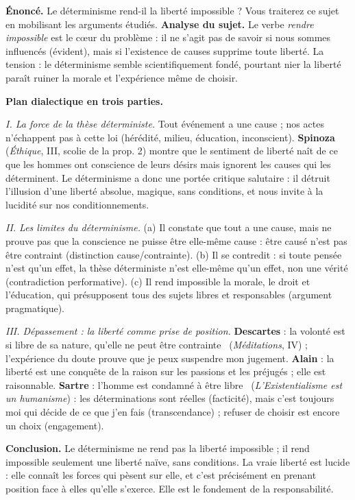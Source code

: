 \documentclass[11pt]{article}
\newcommand{\cle}[1]{{\popxbold\color{popdark}#1}}
\begin{document}
\begin{exoresolu}
\textbf{Énoncé.} Le déterminisme rend-il la liberté impossible ? Vous traiterez ce sujet en mobilisant les arguments étudiés.
\tcblower
\textbf{Analyse du sujet.} Le verbe \emph{rendre impossible} est le cœur du problème : il ne s'agit pas de savoir si nous sommes influencés (évident), mais si l'existence de causes supprime toute liberté. La tension : le déterminisme semble scientifiquement fondé, pourtant nier la liberté paraît ruiner la morale et l'expérience même de choisir.

\textbf{Plan dialectique en trois parties.}

\emph{I. La force de la thèse déterministe.} Tout événement a une cause ; nos actes n'échappent pas à cette loi (hérédité, milieu, éducation, inconscient). \textbf{Spinoza} (\emph{Éthique}, III, scolie de la prop. 2) montre que le sentiment de liberté naît de ce que les hommes ont conscience de leurs désirs mais ignorent les causes qui les déterminent. Le déterminisme a donc une portée critique salutaire : il détruit l'illusion d'une liberté absolue, magique, sans conditions, et nous invite à la lucidité sur nos conditionnements.

\emph{II. Les limites du déterminisme.} (a) Il constate que tout a une cause, mais ne prouve pas que la conscience ne puisse être elle-même cause : être causé n'est pas être contraint (distinction cause/contrainte). (b) Il se contredit : si toute pensée n'est qu'un effet, la thèse déterministe n'est elle-même qu'un effet, non une vérité (contradiction performative). (c) Il rend impossible la morale, le droit et l'éducation, qui présupposent tous des sujets libres et responsables (argument pragmatique).

\emph{III. Dépassement : la liberté comme prise de position.} \textbf{Descartes} : la volonté est \guillemotleft si libre de sa nature, qu'elle ne peut être contrainte \guillemotright\ (\emph{Méditations}, IV) ; l'expérience du doute prouve que je peux suspendre mon jugement. \textbf{Alain} : la liberté est une conquête de la raison sur les passions et les préjugés ; elle est \cle{raisonnable}. \textbf{Sartre} : l'homme est \guillemotleft condamné à être libre \guillemotright\ (\emph{L'Existentialisme est un humanisme}) : les déterminations sont réelles (facticité), mais c'est toujours moi qui décide de ce que j'en fais (transcendance) ; refuser de choisir est encore un choix (\cle{engagement}).

\textbf{Conclusion.} Le déterminisme ne rend pas la liberté impossible ; il rend impossible seulement une liberté naïve, sans conditions. La vraie liberté est lucide : elle connaît les forces qui pèsent sur elle, et c'est précisément en prenant position face à elles qu'elle s'exerce. Elle est le fondement de la responsabilité.
\end{exoresolu}
\end{document}

